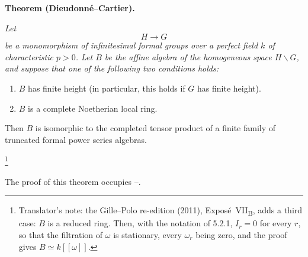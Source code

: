 \medskip
\noindent\textbf{Theorem (Dieudonn\'e--Cartier).}
\label{sga3:VIIB:5.2:theorem}
{\itshape Let
\[
  H\longrightarrow G
\]
be a monomorphism of infinitesimal formal groups over a perfect
field \(k\) of characteristic \(p>0\). Let \(B\) be the affine
algebra of the homogeneous space \(H\backslash G\), and suppose that one of
the following two conditions holds:
\begin{enumerate}
\item[\textup{(i)}]
\(B\) has finite height \textup{(in particular, this holds if
\(G\) has finite height)}.

\item[\textup{\SGAInlineRefTarget{sga3:VIIB:5.2:theorem:item:ii}(ii)}]
\(B\) is a complete Noetherian local ring.
\end{enumerate}
Then \(B\) is isomorphic to the completed tensor product of a
finite family of truncated formal power series algebras.}\footnote{Translator's note: the
Gille--Polo re-edition (2011), Expos\'e~VII\textsubscript{B}, adds a third case: \(B\) is a reduced ring.
Then, with the notation of 5.2.1, \(I_r=0\) for every \(r\), so that the filtration of \(\omega\) is
stationary, every \(\omega_r\) being zero, and the proof gives \(B\simeq k[[\omega]]\).}

The proof of this theorem occupies --.
